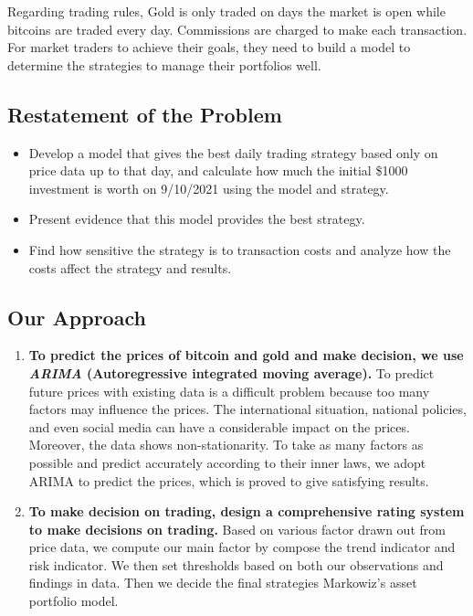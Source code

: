\documentclass[12pt,a4paper]{article}
\newcommand{\Predictor}{ARIMA }
\begin{document}
\begin{spacing}{1.2}
 Regarding trading rules, Gold is only traded on days the market is open while bitcoins are traded every day. Commissions are charged to make each transaction. For market traders to achieve their goals, they need to build a model to determine the strategies to manage their portfolios well.

\subsection{Restatement of the Problem}

\begin{itemize}
	\item Develop a model that gives the best daily trading strategy based only on price data up 
	to that day, and calculate how much the initial \$1000 investment is worth on 9/10/2021 using the 
	model and strategy.
	
	\item Present evidence that this model provides the best strategy.
	
	\item Find how sensitive the strategy is to transaction costs and analyze how the costs
	affect the strategy and results.
	
\end{itemize}

\subsection{Our Approach}

\begin{enumerate}
	\item \textbf{To predict the prices of bitcoin and gold and make decision, we use \textit{\Predictor} (Autoregressive integrated moving average).}
	To predict future prices with existing data is a difficult problem because too many factors may influence the prices. The international situation, national policies, and even social media can have a considerable impact on the prices. Moreover, the data shows non-stationarity. To take as many factors as possible and predict accurately according to their inner laws, we adopt \Predictor to predict the prices, which is proved to give satisfying results.
	
	\item \textbf{To make decision on trading, design a comprehensive rating system to make decisions on trading.} Based on various factor drawn out from price data, we compute our main factor by compose the trend indicator and risk indicator. We then set thresholds based on both our observations and findings in data. Then we decide the final strategies Markowiz's asset portfolio model.
\end{enumerate}


\end{spacing}
\end{document}
